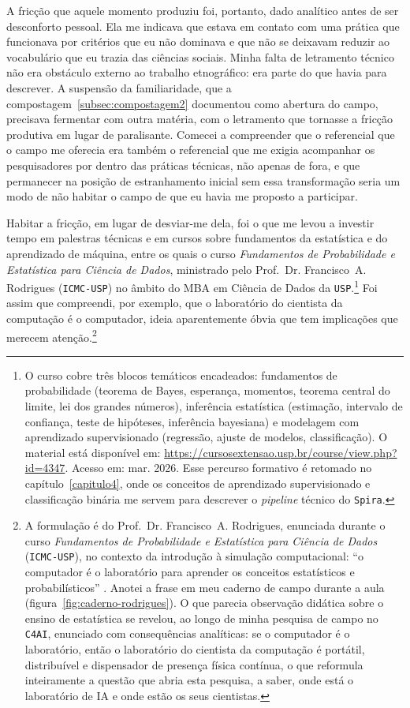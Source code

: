 A fricção que aquele momento produziu foi, portanto, dado analítico antes de ser desconforto pessoal. Ela me indicava que estava em contato com uma prática que funcionava por critérios que eu não dominava e que não se deixavam reduzir ao vocabulário que eu trazia das ciências sociais. Minha falta de letramento técnico não era obstáculo externo ao trabalho etnográfico: era parte do que havia para descrever. A suspensão da familiaridade, que a compostagem~\ref{subsec:compostagem2} documentou como abertura do campo, precisava fermentar com outra matéria, com o letramento que tornasse a fricção produtiva em lugar de paralisante. Comecei a compreender que o referencial que o campo me oferecia era também o referencial que me exigia acompanhar os pesquisadores por dentro das práticas técnicas, não apenas de fora, e que permanecer na posição de estranhamento inicial sem essa transformação seria um modo de não habitar o campo de que eu havia me proposto a participar.

Habitar a fricção, em lugar de desviar-me dela, foi o que me levou a investir tempo em palestras técnicas e em cursos sobre fundamentos da estatística e do aprendizado de máquina, entre os quais o curso \textit{Fundamentos de Probabilidade e Estatística para Ciência de Dados}, ministrado pelo Prof.~Dr. Francisco~A. Rodrigues (\texttt{ICMC-USP}) no âmbito do MBA em Ciência de Dados da \texttt{USP}.\footnote{O curso cobre três blocos temáticos encadeados: fundamentos de probabilidade (teorema de Bayes, esperança, momentos, teorema central do limite, lei dos grandes números), inferência estatística (estimação, intervalo de confiança, teste de hipóteses, inferência bayesiana) e modelagem com aprendizado supervisionado (regressão, ajuste de modelos, classificação). O material está disponível em: \url{https://cursosextensao.usp.br/course/view.php?id=4347}. Acesso em: mar. 2026. Esse percurso formativo é retomado no capítulo~\ref{capitulo4}, onde os conceitos de aprendizado supervisionado e classificação binária me servem para descrever o \emph{pipeline} técnico do \texttt{Spira}.} Foi assim que compreendi, por exemplo, que o laboratório do cientista da computação é o computador, ideia aparentemente óbvia que tem implicações que merecem atenção.\footnote{A formulação é do Prof.~Dr. Francisco~A. Rodrigues, enunciada durante o curso \textit{Fundamentos de Probabilidade e Estatística para Ciência de Dados} (\texttt{ICMC-USP}), no contexto da introdução à simulação computacional: \enquote{o computador é o laboratório para aprender os conceitos estatísticos e probabilísticos} \parencite{Rodrigues2024ProbEstat}. Anotei a frase em meu caderno de campo durante a aula (figura~\ref{fig:caderno-rodrigues}). O que parecia observação didática sobre o ensino de estatística se revelou, ao longo de minha pesquisa de campo no \texttt{C4AI}, enunciado com consequências analíticas: se o computador é o laboratório, então o laboratório do cientista da computação é portátil, distribuível e dispensador de presença física contínua, o que reformula inteiramente a questão que abria esta pesquisa, a saber, onde está o laboratório de IA e onde estão os seus cientistas.}

